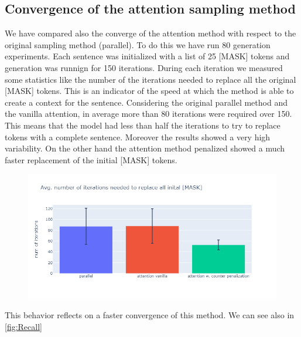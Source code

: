 \documentclass[10pt,twocolumn,letterpaper]{article}
\begin{document}
\subsection{Convergence of the attention sampling method}
We have compared also the converge of the attention method with respect to the original sampling method (parallel).
To do this we have run 80 generation experiments. Each sentence was initialized with a list of 25 [MASK] tokens and
generation was runnign for 150 iterations. During each iteration we measured some statistics like the number of the
iterations needed to replace all the original [MASK] tokens. This is an indicator of the speed at which the method is able to create
a context for the sentence. Considering the original parallel method and the vanilla attention, in average more than 80
iterations were required over 150. This means that the model had less than half the iterations to try to replace tokens
with a complete sentence. Moreover the results showed a very high variability.
On the other hand the attention method penalized showed a much faster replacement of the initial [MASK] tokens.
\begin{figure}[t!]
   \centering
   \includegraphics[scale=0.3]{num_iter_replace_mask.png}
   \caption{
   }
   \label{fig:ReplaceMask}
\end{figure}

This behavior reflects on a faster convergence of this method. We can see also in \ref{fig:Recall}
\end{document}
